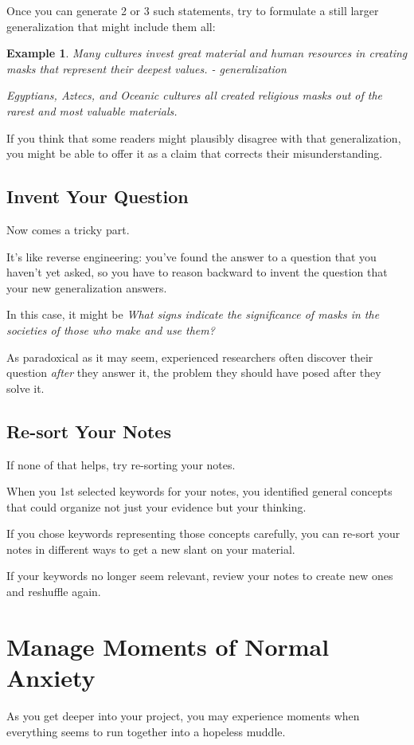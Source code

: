 \documentclass[oneside]{book}
\numberwithin{equation}{section}
\newtheorem{example}{Example}[section]
\begin{document}
%
Once you can generate 2 or 3 such statements, try to formulate a still larger generalization that might include them all:
\begin{example}
    Many cultures invest great material and human resources in creating masks that represent their deepest values. - generalization
    
    Egyptians, Aztecs, and Oceanic cultures all created religious masks out of the rarest and most valuable materials.
\end{example}
If you think that some readers might plausibly disagree with that generalization, you might be able to offer it as a claim that corrects their misunderstanding.

\subsection{Invent Your Question}
Now comes a tricky part.

It's like reverse engineering: you've found the answer to a question that you haven't yet asked, so you have to reason backward to invent the question that your new generalization answers.

In this case, it might be \textit{What signs indicate the significance of masks in the societies of those who make and use them?}

As paradoxical as it may seem, experienced researchers often discover their question \textit{after} they answer it, the problem they should have posed after they solve it.

\subsection{Re-sort Your Notes}
If none of that helps, try re-sorting your notes.

When you 1st selected keywords for your notes, you identified general concepts that could organize not just your evidence but your thinking.

If you chose keywords representing those concepts carefully, you can re-sort your notes in different ways to get a new slant on your material.

If your keywords no longer seem relevant, review your notes to create new ones and reshuffle again.

\section{Manage Moments of Normal Anxiety}
As you get deeper into your project, you may experience moments when everything seems to run together into a hopeless muddle.
\end{document}
